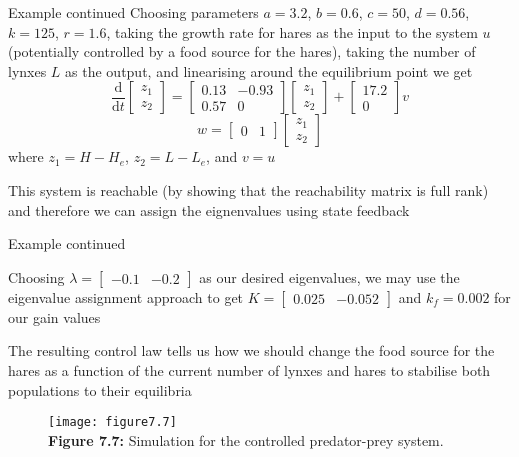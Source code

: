 \documentclass{beamer-control}
\begin{document}
\begin{frame}{Example continued}
Choosing parameters $a=3.2$, $b=0.6$, $c=50$, $d=0.56$, $k=125$,  $r=1.6$, taking the growth rate for hares as the input to the system $u$ (potentially controlled by a food source for the hares), taking the number of lynxes $L$ as the output, and linearising around the equilibrium point we get 
	\[\frac{\mathrm{d}}{\mathrm{d}t}\begin{bmatrix}
		z_1 \\ z_2
	\end{bmatrix} = \begin{bmatrix}
		0.13 & -0.93 \\ 0.57 & 0
	\end{bmatrix} \begin{bmatrix}
		z_1 \\ z_2
	\end{bmatrix}  + \begin{bmatrix}
		17.2 \\ 0
	\end{bmatrix} v\]
	\[w=\begin{bmatrix}
		0& 1
	\end{bmatrix}  \begin{bmatrix}
		z_1 \\ z_2
	\end{bmatrix} \]
where $z_1=H-H_e$, $z_2=L-L_e$, and $v=u$
	
This system is reachable (by showing that the reachability matrix is full rank) and therefore we can assign the eignenvalues using state feedback

\end{frame}

\begin{frame}{Example continued}
	
	Choosing $\lambda=\begin{bmatrix}
		-0.1 & -0.2
	\end{bmatrix}$ as our desired eigenvalues, we may use the eigenvalue assignment approach to get $K=\begin{bmatrix}
		0.025 & -0.052
	\end{bmatrix}$ and $k_f=0.002$ for our gain values
	
	The resulting control law tells us how we should change the food source for the hares as a function of the current number of lynxes and hares to stabilise both populations to their equilibria
\begin{figure}
	\centering
	\texttt{[image: figure7.7]}
	\\
	\textbf{Figure 7.7:} Simulation for the controlled predator-prey system.
\end{figure}
\end{frame}


\SUMMARYFRAME
\FINALE
\end{document}
